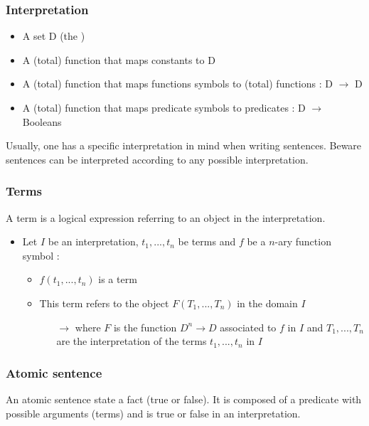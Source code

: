\subsubsection{Interpretation}

\begin{itemize}
\item A set D (the )
\item A (total) function that maps constants to D
\item A (total) function that maps functions symbols to (total) functions : D $\rightarrow$ D
\item A (total) function that maps predicate symbols to predicates : D $\rightarrow$ Booleans
\end{itemize}

Usually, one has a specific interpretation in mind when writing sentences. Beware sentences can be interpreted according to any possible interpretation.

\subsubsection{Terms}

A term is a logical expression referring to an object in the interpretation.
\begin{itemize}
\item Let $I$ be an interpretation, $t_1, ..., t_n$ be terms and $f$ be a $n$-ary function symbol :
	\begin{itemize}
	\item $f(t_1, ..., t_n)$ is a term
	\item This term refers to the object $F(T_1, ..., T_n)$ in the domain $I$
		\begin{itemize}
		\item[$\rightarrow$] where $F$ is the function $D^n \rightarrow D$ associated to $f$ in $I$ and $T_1, ..., T_n$ are the interpretation of the terms $t_1, ..., t_n$ in $I$
		\end{itemize}
	\end{itemize}
\end{itemize}

\subsubsection{Atomic sentence}

An atomic sentence state a fact (true or false). It is composed of a predicate with possible arguments (terms) and is true or false in an interpretation.

